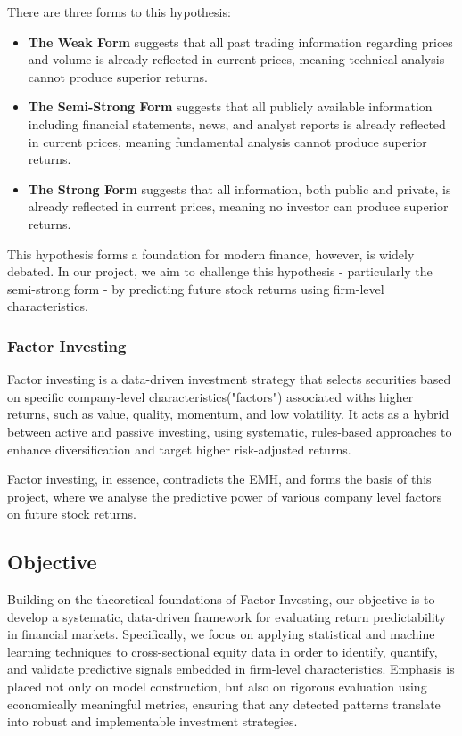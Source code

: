 \documentclass[11pt]{article}
\begin{document}
There are three forms to this hypothesis:
\begin{itemize}
    \item \textbf{The Weak Form} suggests that all past trading information regarding prices and volume is already reflected in current prices, meaning technical analysis cannot produce superior returns.
    \item \textbf{The Semi-Strong Form} suggests that all publicly available information including financial statements, news, and analyst reports is already reflected in current prices, meaning fundamental analysis cannot produce superior returns.
    \item \textbf{The Strong Form} suggests that all information, both public and private, is already reflected in current prices, meaning no investor can produce superior returns.
\end{itemize}
This hypothesis forms a foundation for modern finance, however, is widely debated. In our project, we aim to challenge this hypothesis - particularly the semi-strong form - by predicting future stock returns using firm-level characteristics.

\subsubsection{Factor Investing}
Factor investing is a data-driven investment strategy that selects securities based on specific company-level characteristics("factors") associated withs higher returns, such as value, quality, momentum, and low volatility. It acts as a hybrid between active and passive investing, using systematic, rules-based approaches to enhance diversification and target higher risk-adjusted returns.

Factor investing, in essence, contradicts the EMH, and forms the basis of this project, where we analyse the predictive power of various company level factors on future stock returns.

\subsection{Objective}
Building on the theoretical foundations of Factor Investing, our objective is to develop a systematic, data-driven framework for evaluating return predictability in financial markets. Specifically, we focus on applying statistical and machine learning techniques to cross-sectional equity data in order to identify, quantify, and validate predictive signals embedded in firm-level characteristics. Emphasis is placed not only on model construction, but also on rigorous evaluation using economically meaningful metrics, ensuring that any detected patterns translate into robust and implementable investment strategies.
\end{document}
